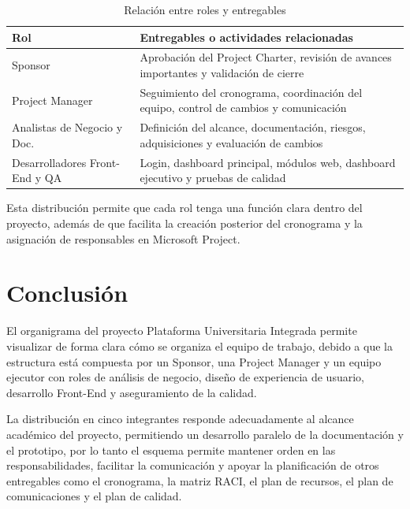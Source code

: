 \documentclass[11pt,spanish]{article}
\renewcommand{\arraystretch}{1.22}
\begin{document}
\begin{table}[H]
\centering
\small
\caption{Relación entre roles y entregables}\label{tab:roles-entregables}
\setlength{\tabcolsep}{5pt}
\renewcommand{\arraystretch}{1.25}
\begin{tabularx}{\textwidth}{p{4.3cm} Y}
\toprule
\textbf{Rol} & \textbf{Entregables o actividades relacionadas} \\
\midrule
Sponsor & Aprobación del Project Charter, revisión de avances importantes y validación de cierre \\
Project Manager & Seguimiento del cronograma, coordinación del equipo, control de cambios y comunicación \\
Analistas de Negocio y Doc. & Definición del alcance, documentación, riesgos, adquisiciones y evaluación de cambios \\
Desarrolladores Front-End y QA & Login, dashboard principal, módulos web, dashboard ejecutivo y pruebas de calidad \\
\bottomrule
\end{tabularx}
\end{table}

Esta distribución permite que cada rol tenga una función clara dentro del proyecto, además de que facilita la creación posterior del cronograma y la asignación de responsables en Microsoft Project.

\section{Conclusión}

El organigrama del proyecto Plataforma Universitaria Integrada permite visualizar de forma clara cómo se organiza el equipo de trabajo, debido a que la estructura está compuesta por un Sponsor, una Project Manager y un equipo ejecutor con roles de análisis de negocio, diseño de experiencia de usuario, desarrollo Front-End y aseguramiento de la calidad.

La distribución en cinco integrantes responde adecuadamente al alcance académico del proyecto, permitiendo un desarrollo paralelo de la documentación y el prototipo, por lo tanto el esquema permite mantener orden en las responsabilidades, facilitar la comunicación y apoyar la planificación de otros entregables como el cronograma, la matriz RACI, el plan de recursos, el plan de comunicaciones y el plan de calidad.
\end{document}
